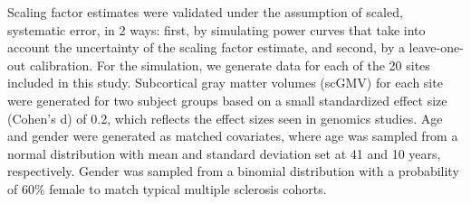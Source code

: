Scaling factor estimates were validated under the assumption of scaled, systematic error, in 2 ways: first, by simulating power curves that take into account the uncertainty of the scaling factor estimate, and second, by a leave-one-out calibration. For the simulation, we generate data for each of the 20 sites included in this study. Subcortical gray matter volumes (scGMV) for each site were generated for two subject groups based on a small standardized effect size (Cohen's d) of 0.2, which reflects the effect sizes seen in genomics studies. Age and gender were generated as matched covariates, where age was sampled from a normal distribution with mean and standard deviation set at 41 and 10 years, respectively. Gender was sampled from a binomial distribution with a probability of 60\% female to match typical multiple sclerosis cohorts. %